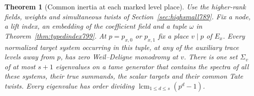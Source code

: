 \documentclass[a4paper,11pt]{article}
\newtheorem{theorem}[proposition]{Theorem}
\theoremstyle{definition}
\theoremstyle{remark}
\numberwithin{equation}{section}
\begin{document}
\begin{theorem}[Common inertia at each marked level place]
\leavevmode\label{thm:markedtype801}
Use the higher-rank fields, weights and simultaneous twists of
Section~\ref{sec:highsmall789}. Fix a node, a lift index, an
embedding of the coefficient field and a tuple \(\omega\) in
Theorem~\ref{thm:typedindex799}. At \(p=p_{x,0}\) or \(p_{x,1}\)
fix a place \(v\mid p\) of \(E_x\). Every normalized target
system occurring in this tuple, at any of the auxiliary trace
levels away from \(p\), has zero Weil--Deligne monodromy at \(v\).
There is one set \(\Sigma_v\) of at most \(s+1\) eigenvalues
on a tame generator that contains the spectra of all these
systems, their true summands, the scalar targets and their
common Tate twists. Every eigenvalue has order dividing
\(\operatorname{lcm}_{1\le d\le s}(p^d-1)\).
\end{theorem}
\end{document}
